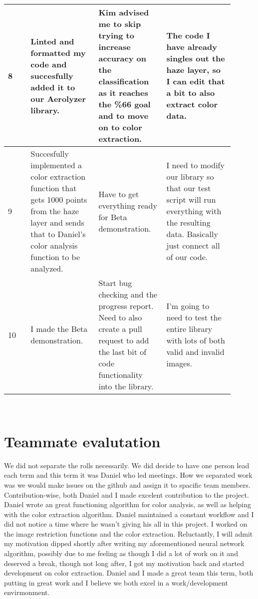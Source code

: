 \documentclass[onecolumn, draftclsnofoot,10pt, compsoc]{IEEEtran}
\begin{document}
\begin{singlespace}
\begin{tabular}{|l|p{0.3\linewidth}|p{0.3\linewidth}|p{0.3\linewidth}|}
		8 	& Linted and formatted my code and succesfully added it to our Aerolyzer library.
			& Kim advised me to skip trying to increase accuracy on the classification as it reaches the \%66 goal and to move on to color extraction.
			& The code I have already singles out the haze layer, so I can edit that a bit to also extract color data. \\\hline

		9 	& Succesfully implemented a color extraction function that gets 1000 points from the haze layer and sends that to Daniel's color analysis function to be analyzed.
			& Have to get everything ready for Beta demonstration.
			& I need to modify our library so that our test script will run everything with the resulting data. Basically just connect all of our code. \\\hline

		10 	& I made the Beta demonstration.
			& Start bug checking and the progress report. Need to also create a pull request to add the last bit of code functionality into the library.
			& I'm going to need to test the entire library with lots of both valid and invalid images. \\\hline
		\end{tabular}\\


	\section{Teammate evalutation}
	We did not separate the rolls necessarily. We did decide to have one person lead each term and this term it was Daniel who led meetings.  
	How we separated work was we would make issues on the github and assign it to spacific team members.
	Contribution-wise, both Daniel and I made excelent contribution to the project.
	Daniel wrote an great functioning algorithm for color analysis, as well as helping with the color extraction algorithm. 
	Daniel maintained a constant workflow and I did not notice a time where he wasn't giving his all in this project. 
	I worked on the image restriction functions and the color extraction.
	Reluctantly, I will admit my motivation dipped shortly after writing my aforementioned neural network algorithm, possibly due to me feeling as though I did a lot of work on it and deserved a break, though not long after, I got my motivation back and started development on color extraction.
	Daniel and I made a great team this term, both putting in great work and I believe we both excel in a work/development envirmonment.

\end{singlespace}
\end{document}
